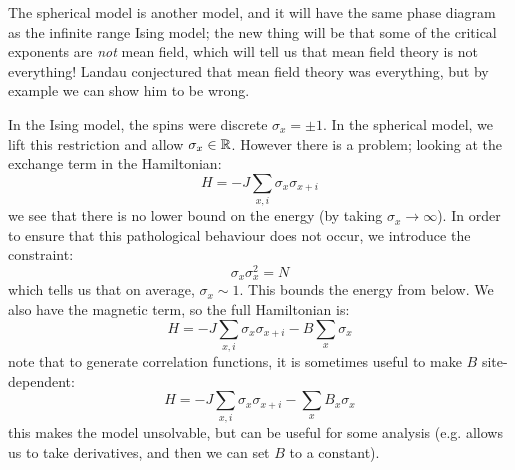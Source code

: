The spherical model is another model, and it will have the same phase diagram as the infinite range Ising model; the new thing will be that some of the critical exponents are \emph{not} mean field, which will tell us that mean field theory is not everything! Landau conjectured that mean field theory was everything, but by example we can show him to be wrong.

In the Ising model, the spins were discrete $\sigma_x = \pm 1$. In the spherical model, we lift this restriction and allow $\sigma_x \in \mathbb{R}$. However there is a problem; looking at the exchange term in the Hamiltonian:
\begin{equation}
    H = -J\sum_{x, i}\sigma_x \sigma_{x + i}
\end{equation}
we see that there is no lower bound on the energy (by taking $\sigma_x \to \infty$). In order to ensure that this pathological behaviour does not occur, we introduce the constraint:
\begin{equation}
    \sigma_x \sigma_x^2 = N
\end{equation}
which tells us that on average, $\sigma_x \sim 1$. This bounds the energy from below. We also have the magnetic term, so the full Hamiltonian is:
\begin{equation}
    H = -J\sum_{x, i}\sigma_{x}\sigma_{x + i} - B \sum_x \sigma_x
\end{equation}
note that to generate correlation functions, it is sometimes useful to make $B$ site-dependent:
\begin{equation}
    H = -J\sum_{x, i}\sigma_{x}\sigma_{x + i} - \sum_x B_x\sigma_x
\end{equation}
this makes the model unsolvable, but can be useful for some analysis (e.g. allows us to take derivatives, and then we can set $B$ to a constant).


